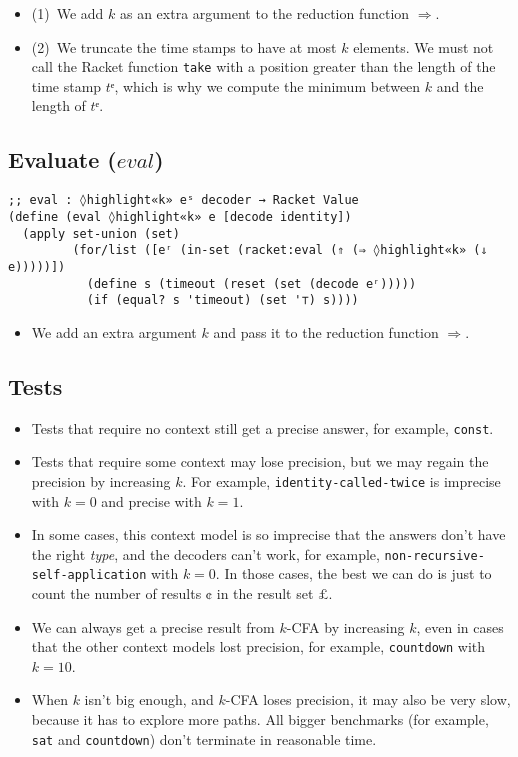 \documentclass[12pt, oneside]{book}
\begin{document}
\begin{itemize}
  \item (1)~We add \(k\) as an extra argument to the reduction function \(⇒\).
  \item (2)~We truncate the time stamps to have at most \(k\) elements. We must not call the Racket function \texttt{take} with a position greater than the length of the time stamp \(tᵉ\), which is why we compute the minimum between \(k\) and the length of \(tᵉ\).
\end{itemize}

\subsection{Evaluate (\(eval\))}

\begin{Verbatim}
;; eval : ◊highlight«k» eˢ decoder → Racket Value
(define (eval ◊highlight«k» e [decode identity])
  (apply set-union (set)
         (for/list ([eʳ (in-set (racket:eval (⇑ (⇒ ◊highlight«k» (⇓ e)))))])
           (define s (timeout (reset (set (decode eʳ)))))
           (if (equal? s 'timeout) (set '⊤) s))))
\end{Verbatim}

\begin{itemize}
  \item We add an extra argument \(k\) and pass it to the reduction function \(⇒\).
\end{itemize}

\subsection{Tests}

\begin{itemize}
  \item Tests that require no context still get a precise answer, for example, \texttt{const}.
  \item Tests that require some context may lose precision, but we may regain the precision by increasing \(k\). For example, \texttt{identity-called-twice} is imprecise with \(k=0\) and precise with \(k=1\).
  \item In some cases, this context model is so imprecise that the answers don’t have the right \emph{type}, and the decoders can’t work, for example, \texttt{non-recursive-self-application} with \(k=0\). In those cases, the best we can do is just to count the number of results \(¢\) in the result set \(£\).
  \item We can always get a precise result from \(k\)-CFA by increasing \(k\), even in cases that the other context models lost precision, for example, \texttt{countdown} with \(k=10\).
  \item When \(k\) isn’t big enough, and \(k\)-CFA loses precision, it may also be very slow, because it has to explore more paths. All bigger benchmarks (for example, \texttt{sat} and \texttt{countdown}) don’t terminate in reasonable time.
\end{itemize}
\end{document}
